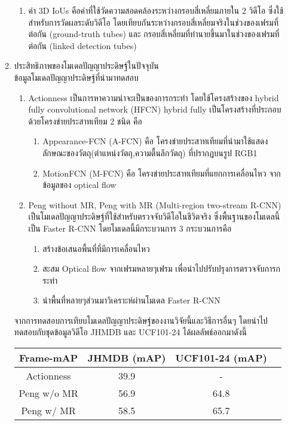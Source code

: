 \begin{enumerate}
\begin{enumerate}
\begin{enumerate}
			\item ค่า 3D IoUs คือค่าที่ใช้วัดความสอดคล้องระหว่างกรอบสี่เหลี่ยมภายใน 2 วิดีโอ ซึ่งใช้สำหรับการวัดผลระดับวิดีโอ โดยเทียบกันระหว่างกรอบสี่เหลี่ยมจริงในช่วงของเฟรมที่ต่อกัน (ground-truth tubes) และ กรอบสี่เหลี่ยมที่ทำนายขึ้นมาในช่วงของเฟรมที่ต่อกัน (linked detection tubes) 
		\end{enumerate}
		\item ประสิทธิภาพของโมเดลปัญญาประดิษฐ์ในปัจจุบัน
		\\ข้อมูลโมเดลปัญญาประดิษฐ์ที่นำมาทดสอบ
		\begin{enumerate}				
			\item Actionness เป็นการหาความน่าจะเป็นของการกระทำ โดยใช้โครงสร้างของ hybrid fully convolutional network (HFCN) hybrid fully เป็นโครงสร้างที่ประกอบด้วยโครงข่ายประสาทเทียม 2 ชนิด คือ
			\begin{enumerate}
				\item Appearance-FCN (A-FCN) คือ โครงข่ายประสาทเทียมที่นำมาใช้แสดงลักษณะของวัตถุ(ตำแหน่งวัตถุ,ความตื้นลึกวัตถุ) ที่ปรากฎบนรูป RGB1
				\item MotionFCN (M-FCN) คือ โครงข่ายประสาทเทียมที่แยกการเคลื่อนไหว จากข้อมูลของ optical flow
			 \end{enumerate}
			\item Peng without MR, Peng with MR (Multi-region two-stream R-CNN) เป็นโมเดลปัญญาประดิษฐ์ที่ใช้สำหรับตรวจจับวิดีโอในชีวิตจริง ซึ่งพื้นฐานของโมเดลนี้เป็น Faster R-CNN โดยโมเดลนี้มีกระบวนการ 3 กระบวนการคือ
			\begin{enumerate}
					\item สร้างข้อเสนอพื้นที่ที่มีการเคลื่อนไหว
					\item สะสม Optical flow จากเฟรมหลายๆเฟรม เพื่อนำไปปรับปรุงการตรวจจับการกระทำ
					\item นำพื้นที่หลายๆส่วนมาวิเคราะห์ผ่านโมเดล Faster R-CNN
			\end{enumerate}
		\end{enumerate}
		จากการทดสอบการเทียบโมเดลปัญญาประดิษฐ์ของงานวิจัยนี้และวิธีการอื่นๆ โดยนำไปทดสอบกับชุดข้อมูลวิดีโอ JHMDB และ UCF101-24 ได้ผลลัพธ์ออกมาดังนี้
			\begin{table}[!ht]
				\centering
				\begin{tabular}{|c|c|c|c|}
					\hline
					{Frame-mAP}&{JHMDB (mAP)}&{UCF101-24 (mAP)}								\\
					\hline
					Actionness 			& 39.9				& 	-						\\
					Peng w/o MR			& 56.9				& 64.8						\\
					Peng w/  MR 			& 58.5				& 65.7						\\

\end{tabular}
\end{table}
\end{enumerate}
\end{enumerate}
